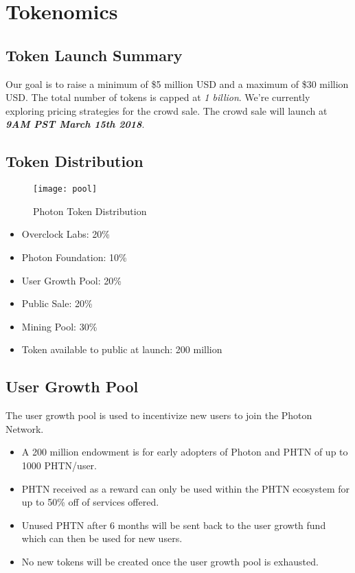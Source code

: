 \title{}
\author{}
\date{\today}
\abstract{}
\maketitle

\section{Tokenomics}


\subsection{Token Launch Summary}
Our goal is to raise a minimum of \$5 million USD and a maximum of \$30 million USD. The total number of tokens is capped at \textit{1 billion}. We're currently exploring pricing strategies for the crowd sale. The crowd sale will launch at \textit{\textbf{9AM PST March 15th 2018}}.

\subsection{Token Distribution}
\begin{figure}[htp]
\centering
  \texttt{[image: pool]}
  \caption{Photon Token Distribution}
\end{figure}

\begin{itemize}
  \item Overclock Labs: 20\%
  \item Photon Foundation: 10\%
  \item User Growth Pool: 20\%
  \item Public Sale: 20\% 
  \item Mining Pool: 30\%
  \item Token available to public at launch: 200 million 
\end{itemize}

\subsection{User Growth Pool}
The user growth pool is used to incentivize new users to join the Photon Network.                                                                                                   \begin{itemize}
  \item A 200 million endowment is for early adopters of Photon and PHTN of up to 1000 PHTN/user.
  \item PHTN received as a reward can only be used within the PHTN ecosystem for up to 50\% off of services offered.
  \item Unused PHTN after 6 months will be sent back to the user growth fund which can then be used for new users.
  \item No new tokens will be created once the user growth pool is exhausted.
\end{itemize}

